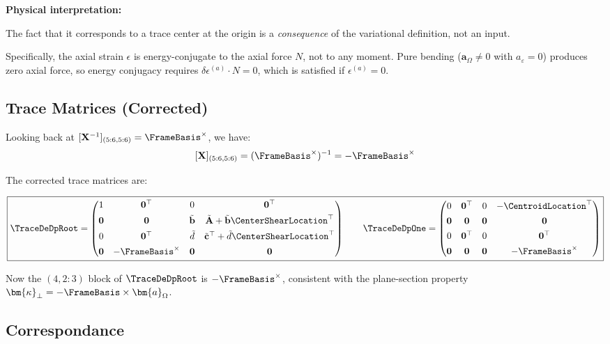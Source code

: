 \textbf{Physical interpretation:}

The fact that
it corresponds to a trace center at the origin is a \emph{consequence}
of the variational definition, not an input.

Specifically, the axial strain \(\epsilon\) is energy-conjugate
to the axial force \(N\), not to any moment. Pure bending
(\(\bm{a}_\Omega \neq 0\) with \(a_\varepsilon = 0\)) produces zero
axial force, so energy conjugacy requires
\(\delta\epsilon^{(a)} \cdot N = 0\), which is satisfied if
\(\epsilon^{(a)} = 0\).

\subsection{Trace Matrices (Corrected)}

Looking back at \([\mathbf{X}^{-1}]_{(5:6, 5:6)} = \FrameBasis^\times\),
we have:
\[[\mathbf{X}]_{(5:6, 5:6)} = (\FrameBasis^\times)^{-1} = -\FrameBasis^\times
\]


The corrected trace matrices are:

\[
\boxed{\TraceDeDpRoot = \begin{pmatrix}
1 & \mathbf{0}^\top & 0 & \mathbf{0}^\top \\[4pt]
\mathbf{0} & \mathbf{0} & \tilde{\mathbf{b}} & \tilde{\mathbf{A}} + \tilde{\mathbf{b}}\CenterShearLocation^\top \\[4pt]
0 & \mathbf{0}^\top & \tilde{d} & \tilde{\mathbf{c}}^\top + \tilde{d}\CenterShearLocation^\top \\[4pt]
\mathbf{0} & -\FrameBasis^\times & \mathbf{0} & \mathbf{0}
\end{pmatrix}
\qquad 
\TraceDeDpOne = \begin{pmatrix}
0 & \mathbf{0}^\top & 0 & -\CentroidLocation^\top \\[4pt]
\mathbf{0} & \mathbf{0} & \mathbf{0} & \mathbf{0} \\[4pt]
0 & \mathbf{0}^\top & 0 & \mathbf{0}^\top \\[4pt]
\mathbf{0} & \mathbf{0} & \mathbf{0} & -\FrameBasis^\times
\end{pmatrix}}\]

Now the \((4, 2:3)\) block of \(\TraceDeDpRoot\) is
\(-\FrameBasis^\times\), consistent with the plane-section property
\(\bm{\kappa}_\perp = -\FrameBasis \times \bm{a}_\Omega\).

\subsection{Correspondance}

